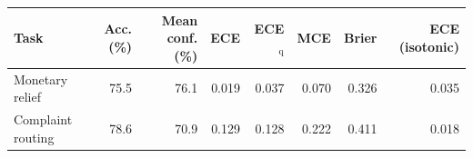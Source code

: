 \begin{tabular}{@{}lrrrrrrr@{}}
\toprule
Task & Acc. (\%) & Mean conf. (\%) & ECE & ECE$_{\mathrm{q}}$ & MCE & Brier & ECE (isotonic) \\
\midrule
Monetary relief & 75.5 & 76.1 & 0.019 & 0.037 & 0.070 & 0.326 & 0.035 \\
Complaint routing & 78.6 & 70.9 & 0.129 & 0.128 & 0.222 & 0.411 & 0.018 \\
\bottomrule
\end{tabular}
